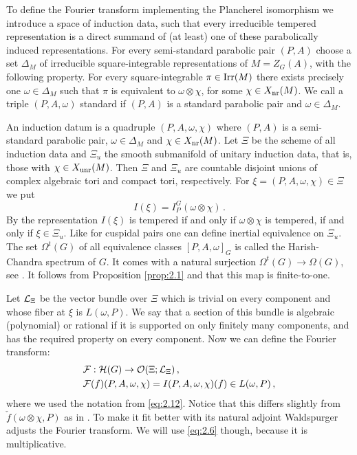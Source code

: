 To define the Fourier transform implementing the Plancherel
isomorphism we introduce a space of induction data, such that
every irreducible tempered representation is a direct summand of
(at least) one of these parabolically induced representations. For
every semi-standard parabolic pair $(P,A)$ choose a set 
$\Delta_M$ of irreducible square-integrable representations of
$M = Z_G (A)$, with the following property. For every
square-integrable $\pi \in \mathrm{Irr}(M)$ there exists precisely one
$\omega \in \Delta_M$ such that $\pi$ is equivalent to $\omega \otimes \chi$, 
for some $\chi \in X_{\mathrm{nr}} (M)$. We call a triple $(P,A,\omega )$ standard if 
$(P,A)$ is a standard parabolic pair and $\omega \in \Delta_M$.

An induction datum is a quadruple $(P,A,\omega,\chi )$ where
$(P,A)$ is a semi-standard parabolic pair, $\omega \in \Delta_M$
and $\chi \in X_{\mathrm{nr}} (M)$. Let $\Xi$ be the scheme of all induction
data and $\Xi_u$ the smooth submanifold of unitary induction data,
that is, those with $\chi \in X_{\mathrm{unr}} (M)$. Then $\Xi$ and $\Xi_u$ are
countable disjoint unions of complex algebraic tori and compact tori,
respectively. For $\xi = (P,A,\omega,\chi ) \in \Xi$ we put
\[
I(\xi) = I_P^G (\omega \otimes \chi) \,.
\]
By \cite[Lemme III.2.3]{Wal} the representation $I(\xi)$ is
tempered if and only if $\omega \otimes \chi$ is tempered, if and
only if $\xi \in \Xi_u$. Like for cuspidal pairs one can define
inertial equivalence on $\Xi_u$. The set $\Omega^t (G)$ of all
equivalence classes $[P,A,\omega]_G$ is called the Harish-Chandra
spectrum of $G$. It comes with a natural surjection
$\Omega^t (G) \to \Omega (G)$, see \cite[Section 1]{SSZ}. It follows
from Proposition \ref{prop:2.1} and \cite[Th\'eor\`eme VIII.1.2]{Wal} 
that this map is finite-to-one.

Let $\mathcal L_{\Xi}$ be the vector bundle over $\Xi$ which is trivial
on every component and whose fiber at $\xi$ is $L(\omega,P)$. We
say that a section of this bundle is algebraic (polynomial) or
rational if it is supported on only finitely many components, and
has the required property on every component. Now we can define
the Fourier transform:
\begin{equation}\label{eq:2.6}
\begin{aligned}
& \mathcal F : \mathcal H (G) \to \mathcal O (\Xi ; \mathcal L_{\Xi}) \,, \\
& \mathcal F (f) (P,A,\omega,\chi ) = I(P,A,\omega,\chi)(f) \in
L(\omega ,P) \,,
\end{aligned}
\end{equation}
where we used the notation from \eqref{eq:2.12}.
Notice that this differs slightly from $\check f (\omega \otimes
\chi,P)$ as in \cite[\S VII.1]{Wal}. To make it fit better with
its natural adjoint Waldspurger adjusts the Fourier transform. We
will use \eqref{eq:2.6} though, because it is multiplicative.

